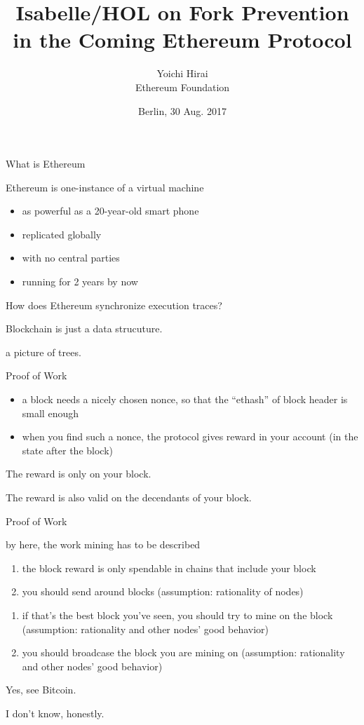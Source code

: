 \documentclass{beamer}
\title{Isabelle/HOL on Fork Prevention\\ in the Coming Ethereum Protocol}
\author{Yoichi Hirai\\ {\small Ethereum Foundation}}
\date{Berlin, 30 Aug. 2017}
\begin{document}
\begin{frame}
\titlepage
\end{frame}

\begin{frame}{What is Ethereum}

Ethereum is one-instance of a virtual machine
\begin{itemize}
\item as powerful as a 20-year-old smart phone
\item replicated globally
\item with no central parties
\item running for 2 years by now
\end{itemize}

\vfill

How does Ethereum synchronize execution traces?
\end{frame}

\begin{frame}{Blockchain}
is just a data strucuture.

a picture of trees.
\end{frame}


\begin{frame}{Proof of Work}

\begin{itemize}
\item a block needs a nicely chosen nonce, so that the ``ethash'' of block header is small enough
\item when you find such a nonce, the protocol gives reward in your account (in the state after the block)
\end{itemize}

The reward is only on your block.


The reward is also valid on the decendants of your block.

\end{frame}


\begin{frame}{Proof of Work}

\alert{by here, the work mining has to be described}

\begin{enumerate}
\item the block reward is only spendable in chains that include your block
\item you should send around blocks (assumption: rationality of nodes)
\end{enumerate}

\begin{enumerate}
\item if that's the best block you've seen, you should try to mine on the block (assumption: rationality and other nodes' good behavior)
\item you should broadcase the block you are mining on (assumption: rationality and other nodes' good behavior)
\end{enumerate}

  Yes, see Bitcoin.

  I don't know, honestly.
\end{frame}
\end{document}
